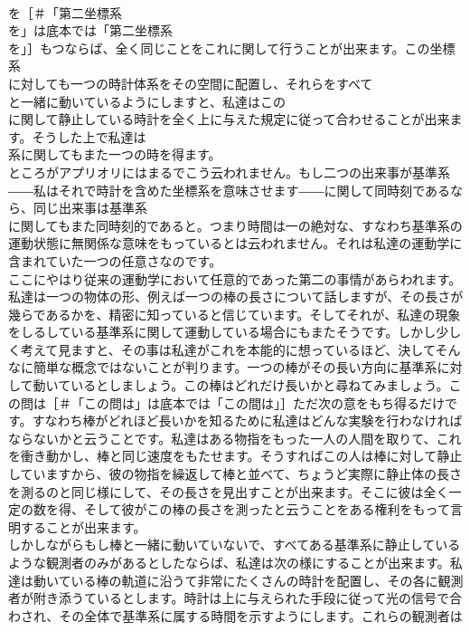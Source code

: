 \documentclass[8pt]{extreport}
\begin{document}
\begin{CJK}{UTF8}{min}
\\	を［＃「第二坐標系 
\\	を」は底本では「第二坐標系 
\\	を」］もつならば、全く同じことをこれに関して行うことが出来ます。この坐標系 
\\	に対しても一つの時計体系をその空間に配置し、それらをすべて 
\\	と一緒に動いているようにしますと、私達はこの 
\\	に関して静止している時計を全く上に与えた規定に従って合わせることが出来ます。そうした上で私達は 
\\	系に関してもまた一つの時を得ます。
\\	ところがアプリオリにはまるでこう云われません。もし二つの出来事が基準系 
\\	――私はそれで時計を含めた坐標系を意味させます――に関して同時刻であるなら、同じ出来事は基準系 
\\	に関してもまた同時刻的であると。つまり時間は一の絶対な、すなわち基準系の運動状態に無関係な意味をもっているとは云われません。それは私達の運動学に含まれていた一つの任意さなのです。
\\	ここにやはり従来の運動学において任意的であった第二の事情があらわれます。私達は一つの物体の形、例えば一つの棒の長さについて話しますが、その長さが幾らであるかを、精密に知っていると信じています。そしてそれが、私達の現象をしるしている基準系に関して運動している場合にもまたそうです。しかし少しく考えて見ますと、その事は私達がこれを本能的に想っているほど、決してそんなに簡単な概念ではないことが判ります。一つの棒がその長い方向に基準系に対して動いているとしましょう。この棒はどれだけ長いかと尋ねてみましょう。この問は［＃「この問は」は底本では「この間は」］ただ次の意をもち得るだけです。すなわち棒がどれほど長いかを知るために私達はどんな実験を行わなければならないかと云うことです。私達はある物指をもった一人の人間を取りて、これを衝き動かし、棒と同じ速度をもたせます。そうすればこの人は棒に対して静止していますから、彼の物指を繰返して棒と並べて、ちょうど実際に静止体の長さを測るのと同じ様にして、その長さを見出すことが出来ます。そこに彼は全く一定の数を得、そして彼がこの棒の長さを測ったと云うことをある権利をもって言明することが出来ます。
\\	しかしながらもし棒と一緒に動いていないで、すべてある基準系に静止しているような観測者のみがあるとしたならば、私達は次の様にすることが出来ます。私達は動いている棒の軌道に沿うて非常にたくさんの時計を配置し、その各に観測者が附き添うているとします。時計は上に与えられた手段に従って光の信号で合わされ、その全体で基準系に属する時間を示すようにします。これらの観測者は 

\end{CJK}
\end{document}
